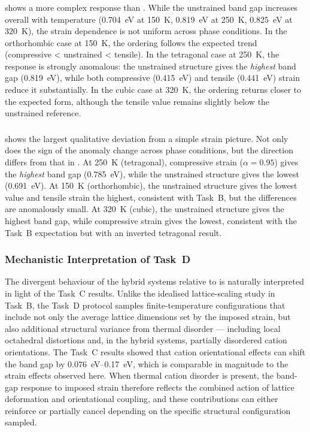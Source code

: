 \subsubsection{\FASnI{}}

\FASnI{} shows a more complex response than \CsSnI{}.
While the unstrained band gap increases overall with temperature
(\SI{0.704}{eV} at \SI{150}{K}, \SI{0.819}{eV} at \SI{250}{K},
\SI{0.825}{eV} at \SI{320}{K}), the strain dependence is not
uniform across phase conditions.
In the orthorhombic case at \SI{150}{K}, the ordering follows the
expected trend (compressive < unstrained < tensile).
In the tetragonal case at \SI{250}{K}, the response is strongly
anomalous: the unstrained structure gives the \emph{highest} band
gap (\SI{0.819}{eV}), while both compressive (\SI{0.415}{eV}) and
tensile (\SI{0.441}{eV}) strain reduce it substantially.
In the cubic case at \SI{320}{K}, the ordering returns closer to
the expected form, although the tensile value remains slightly below
the unstrained reference.

\subsubsection{\MASnI{}}

\MASnI{} shows the largest qualitative deviation from a simple strain
picture.
Not only does the sign of the anomaly change across phase conditions,
but the direction differs from that in \FASnI{}.
At \SI{250}{K} (tetragonal), compressive strain ($\alpha=0.95$)
gives the \emph{highest} band gap (\SI{0.785}{eV}), while the
unstrained structure gives the lowest (\SI{0.691}{eV}).
At \SI{150}{K} (orthorhombic), the unstrained structure gives the
lowest value and tensile strain the highest, consistent with
Task~B, but the differences are anomalously small.
At \SI{320}{K} (cubic), the unstrained structure gives the highest
band gap, while compressive strain gives the lowest, consistent with
the Task~B expectation but with an inverted tetragonal result.

\subsubsection{Mechanistic Interpretation of Task~D}

The divergent behaviour of the hybrid systems relative to \CsSnI{}
is naturally interpreted in light of the Task~C results.
Unlike the idealised lattice-scaling study in Task~B, the Task~D
protocol samples finite-temperature configurations that include not
only the average lattice dimensions set by the imposed strain, but
also additional structural variance from thermal disorder ---
including local octahedral distortions and, in the hybrid systems,
partially disordered cation orientations.
The Task~C results showed that cation orientational effects can
shift the band gap by \SIrange{0.076}{0.17}{eV}, which is
comparable in magnitude to the strain effects observed here.
When thermal cation disorder is present, the band-gap response to
imposed strain therefore reflects the combined action of lattice
deformation and orientational coupling, and these contributions can
either reinforce or partially cancel depending on the specific
structural configuration sampled.

